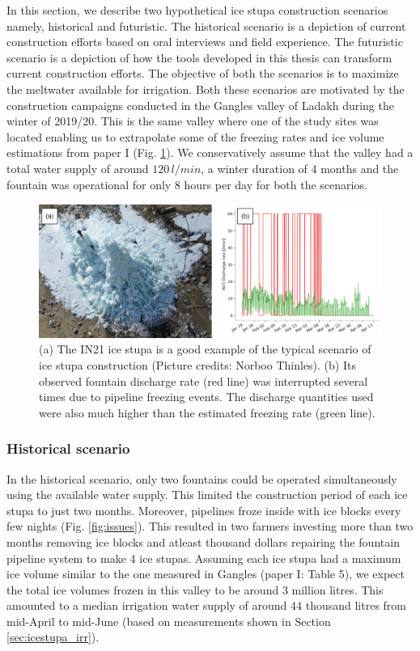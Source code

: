 In this section, we describe two hypothetical ice stupa construction scenarios namely, historical and
futuristic. The historical scenario is a depiction of current construction efforts based on oral interviews and
field experience. The futuristic scenario is a depiction of how the tools developed in this thesis can transform
current construction efforts. The objective of both the scenarios is to maximize the meltwater available for
irrigation. Both these scenarios are motivated by the construction campaigns conducted in the Gangles valley of
Ladakh during the winter of 2019/20. This is the same valley where one of the study sites was located enabling
us to extrapolate some of the freezing rates and ice volume estimations from paper I (Fig.
\ref{fig:gangles_data}). We conservatively assume that the valley had a total water supply of around
$120\,l/min$, a winter duration of 4 months and the fountain was operational for only 8 hours per day for both
the scenarios. 

\begin{figure}[htb]
	\includegraphics[width=\textwidth]{figs/gangles_data}

  \caption{(a) The IN21 ice stupa is a good example of the typical scenario of ice stupa construction (Picture
  credits: Norboo Thinles). (b) Its observed fountain discharge rate (red line) was interrupted several times
  due to pipeline freezing events. The discharge quantities used were also much higher than the estimated
  freezing rate (green line). }

	\label{fig:gangles_data}
\end{figure}

\subsubsection{Historical scenario}

In the historical scenario, only two fountains could be operated simultaneously using the available water
supply. This limited the construction period of each ice stupa to just two months. Moreover, pipelines froze
inside with ice blocks every few nights (Fig. \ref{fig:issues}). This resulted in two farmers investing more
than two months removing ice blocks and atleast thousand dollars repairing the fountain pipeline system to make
4 ice stupas. Assuming each ice stupa had a maximum ice volume similar to the one measured in Gangles (paper I:
Table 5), we expect the total ice volumes frozen in this valley to be around 3 million litres. This amounted to
a median irrigation water supply of around 44 thousand litres from mid-April to mid-June (based on measurements
shown in Section \ref{sec:icestupa_irr}).   


